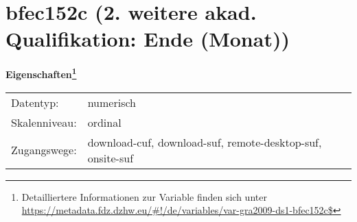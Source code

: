 
    \setcounter{footnote}{0}

    \vspace*{-1.8cm}
	\section{bfec152c (2. weitere akad. Qualifikation: Ende (Monat))}
	\label{section:bfec152c}



    \vspace*{0.5cm}
    \noindent\textbf{Eigenschaften\footnote{Detailliertere Informationen zur Variable finden sich unter
		\url{https://metadata.fdz.dzhw.eu/\#!/de/variables/var-gra2009-ds1-bfec152c$}}}\\
	\begin{tabularx}{\hsize}{@{}lX}
	Datentyp: & numerisch \\
	Skalenniveau: & ordinal \\
	Zugangswege: &
	  download-cuf, 
	  download-suf, 
	  remote-desktop-suf, 
	  onsite-suf
 \\
    \end{tabularx}



